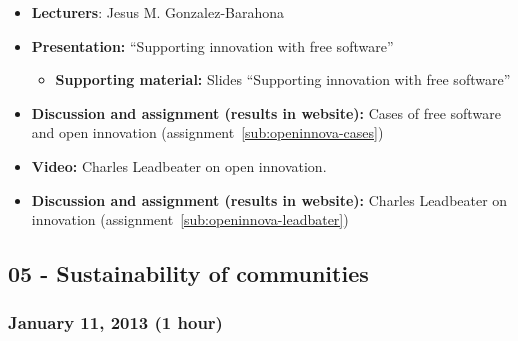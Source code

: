 \documentclass[a4paper]{article}
\begin{document}
\begin{itemize}
\item \textbf{Lecturers}: Jesus M. Gonzalez-Barahona
\item \textbf{Presentation:} ``Supporting innovation with free software''
  \begin{itemize}
  \item \textbf{Supporting material:} Slides ``Supporting innovation with free software''
  \end{itemize}
\item \textbf{Discussion and assignment (results in website):} Cases of free software and open innovation (assignment~\ref{sub:openinnova-cases})
\item \textbf{Video:} Charles Leadbeater on open innovation.
\item \textbf{Discussion and assignment (results in website):} Charles Leadbeater on innovation (assignment~\ref{sub:openinnova-leadbater})
\end{itemize}




\subsection{05 - Sustainability of communities}


\subsubsection{January 11, 2013 (1 hour)}
\end{document}
